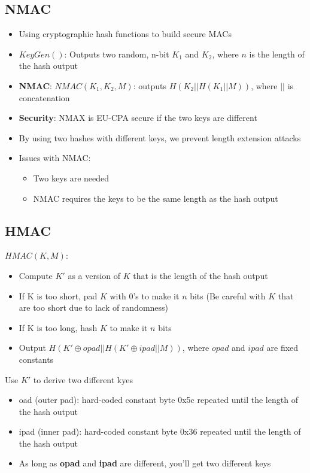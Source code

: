 \documentclass[12pt,a4paper]{article}
\begin{document}
\subsection{NMAC}
\begin{itemize}
    \item Using cryptographic hash functions to build secure MACs
    \item $KeyGen()$: Outputs two random, n-bit $K_1$ and $K_2$, where $n$ is the length of the hash output
    \item \textbf{NMAC}: $NMAC(K_1, K_2, M)$: outputs $H(K_2 || H(K_1 || M))$, where $||$ is concatenation
    \item \textbf{Security}: NMAX is EU-CPA secure if the two keys are different 
    \item By using two hashes with different keys, we prevent length extension attacks
    \item Issues with NMAC:
    \begin{itemize}
        \item Two keys are needed
        \item NMAC requires the keys to be the same length as the hash output
    \end{itemize}
\end{itemize}

\subsection{HMAC}
$HMAC(K, M)$:
\begin{itemize}
    \item Compute $K'$ as a version of $K$ that is the length of the hash output
    \item If K is too short, pad $K$ with 0's to make it $n$ bits (Be careful with $K$ that are too short due to lack of randomness)
    \item If K is too long, hash $K$ to make it $n$ bits
    \item Output $H(K' \oplus opad || H(K' \oplus ipad || M))$, where $opad$ and $ipad$ are fixed constants
\end{itemize}

\noindent Use $K'$ to derive two different kyes
\begin{itemize}
    \item oad (outer pad): hard-coded constant byte 0x5c repeated until the length of the hash output
    \item ipad (inner pad): hard-coded constant byte 0x36 repeated until the length of the hash output
    \item As long as \textbf{opad} and \textbf{ipad} are different, you'll get two different keys
\end{itemize}
\end{document}
